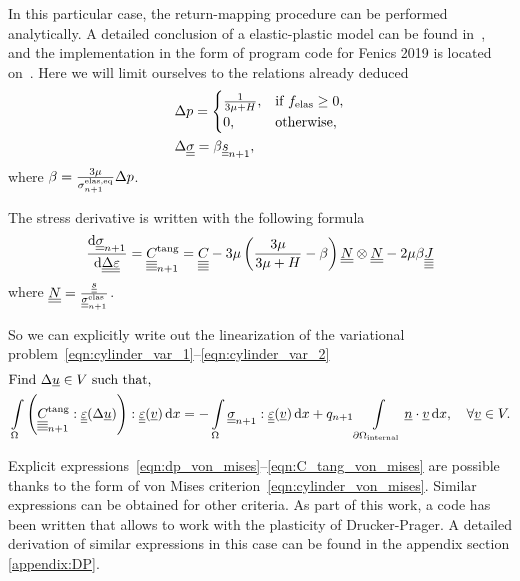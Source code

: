 \documentclass[12pt]{article}
\begin{document}
In this particular case, the return-mapping procedure can be performed analytically. A detailed conclusion of a elastic-plastic model can be found in~\parencite{bonnet:hal-01083772}, and the implementation in the form of program code for Fenics 2019 is located on~\parencite{bleyer2018numericaltours}. Here we will limit ourselves to the relations already deduced
\begin{align}
    &\Delta p = 
    \begin{cases}
        \frac{1}{3\mu + H}, & \text{if } f_\text{elas} \geq 0,\\
        0, & \text{otherwise},
    \end{cases} \label{eqn:dp_von_mises}\\
    &\Delta\underline{\underline{\sigma}} = \beta\underline{\underline{s}}_{n+1}, \label{eqn:dsigma_von_mises}
\end{align}
where $\beta = \frac{3\mu}{\sigma_{n+1}^\text{elas,eq}}\Delta p$.

The stress derivative is written with the following formula
\begin{equation}
    \dfrac{\mathrm{d}\underline{\underline{\sigma}}_{n+1}}{\mathrm{d}\underline{\underline{\Delta\varepsilon}}} = \underline{\underline{\underline{\underline{C_{}}}}}_{n+1}^{\text{tang}} = \underline{\underline{\underline{\underline{C_{}}}}} - 3\mu \left( \frac{3\mu}{3\mu + H} -\beta \right) \underline{\underline{N}} \otimes \underline{\underline{N}} - 2\mu\beta\underline{\underline{\underline{\underline{J}}}} \label{eqn:C_tang_von_mises}
\end{equation}
where $\underline{\underline{N}} = \frac{\underline{\underline{s}}}{\underline{\underline{\sigma}}_{n+1}^{\text{elas}}}$.

So we can explicitly write out the linearization of the variational problem~\eqref{eqn:cylinder_var_1}--\eqref{eqn:cylinder_var_2}
\begin{align}
    & \text{Find } \Delta\underline{u} \in V \text{ such that,} \label{eqn:cylinder_lin_var_from_1} \\ 
    & \int\limits_\Omega \left( \underline{\underline{\underline{\underline{C_{}}}}}_{n+1}^\text{tang} : \underline{\underline{\varepsilon}}(\Delta\underline{u}) \right) : \underline{\underline{\varepsilon}}(\underline{v}) \, \mathrm{d} x = -\int\limits_\Omega\underline{\underline{\sigma}}_{n+1} : \underline{\underline{\varepsilon}}(\underline{v}) \, \mathrm{d} x + q_{n+1}\int\limits_{\partial\Omega_\text{internal}}\underline{n} \cdot \underline{v} \, \mathrm{d} x, \quad \forall \underline{v} \in V. \label{eqn:cylinder_lin_var_from_2} 
\end{align}

Explicit expressions~\eqref{eqn:dp_von_mises}--\eqref{eqn:C_tang_von_mises} are possible thanks to the form of von Mises criterion~\eqref{eqn:cylinder_von_mises}. Similar expressions can be obtained for other criteria. As part of this work, a code has been written that allows to work with the plasticity of Drucker-Prager. A detailed derivation of similar expressions in this case can be found in the appendix section \ref{appendix:DP}.
\end{document}
